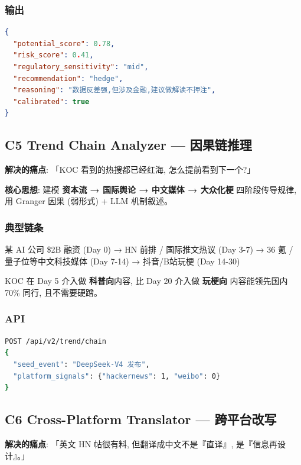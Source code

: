 \subsubsection{输出}

\begin{lstlisting}[language=json]
{
  "potential_score": 0.78,
  "risk_score": 0.41,
  "regulatory_sensitivity": "mid",
  "recommendation": "hedge",
  "reasoning": "数据反差强,但涉及金融,建议做解读不押注",
  "calibrated": true
}
\end{lstlisting}

\subsection{C5 Trend Chain Analyzer — 因果链推理}

\textbf{解决的痛点}: 「KOC 看到的热搜都已经红海, 怎么提前看到下一个?」

\textbf{核心思想}: 建模 \textbf{资本流 → 国际舆论 → 中文媒体 → 大众化梗} 四阶段传导规律, 用 Granger 因果 (弱形式) + LLM 机制叙述。

\subsubsection{典型链条}

\begin{quote-box}
某 AI 公司 \$2B 融资 (Day 0) → HN 前排 / 国际推文热议 (Day 3-7) → 36 氪 / 量子位等中文科技媒体 (Day 7-14) → 抖音/B站玩梗 (Day 14-30)
\end{quote-box}

KOC 在 Day 5 介入做 \textbf{科普向}内容, 比 Day 20 介入做 \textbf{玩梗向} 内容能领先国内 70\% 同行, 且不需要硬蹭。

\subsubsection{API}

\begin{lstlisting}[language=bash]
POST /api/v2/trend/chain
{
  "seed_event": "DeepSeek-V4 发布",
  "platform_signals": {"hackernews": 1, "weibo": 0}
}
\end{lstlisting}

\subsection{C6 Cross-Platform Translator — 跨平台改写}

\textbf{解决的痛点}: 「英文 HN 帖很有料, 但翻译成中文不是『直译』, 是『信息再设计』。」

